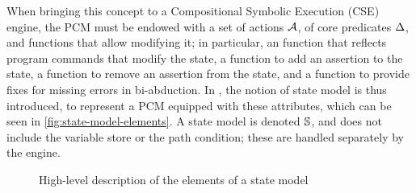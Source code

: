 When bringing this concept to a Compositional Symbolic Execution (CSE) engine, the PCM must be endowed with a set of actions ${\cal{A}}$, of core predicates $\Delta$, and functions that allow modifying it; in particular, an \execac{} function that reflects program commands that modify the state, a \produce{} function to add an assertion to the state, a \consume{} function to remove an assertion from the state, and a \fix{} function to provide fixes for missing errors in bi-abduction. In \cite{cse1,cse2,sacha-phd}, the notion of state model is thus introduced, to represent a PCM equipped with these attributes, which can be seen in \autoref{fig:state-model-elements}. A state model is denoted $\mathbb S$, and does not include the variable store or the path condition; these are handled separately by the engine.

\begin{figure}\centering
\setlength{\fboxsep}{0.3cm}
\noindent{}%
\vspace{0.2cm}
\caption{High-level description of the elements of a state model}
\label{fig:state-model-elements}
\end{figure}

